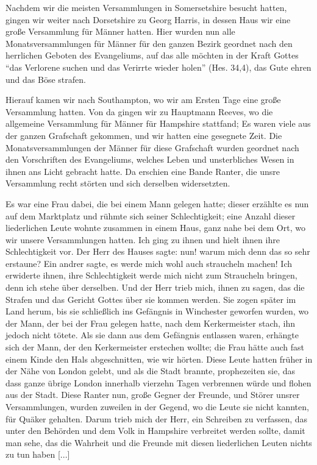 Nachdem wir die meisten Versammlungen in Somersetshire
besucht hatten, gingen wir weiter nach Dorsetshire 
zu Georg Harris,
in dessen Haus wir eine große Versammlung für Männer hatten.
Hier wurden nun alle Monatsversammlungen für Männer für
den ganzen Bezirk geordnet nach den herrlichen Geboten des
Evangeliums, auf das alle möchten in der Kraft Gottes "`das
Verlorene suchen und das Verirrte wieder holen"' (Hes. 34,4),
das Gute ehren und das Böse strafen.

Hierauf kamen wir nach Southampton, wo wir am Ersten
Tage eine große Versammlung hatten. Von da gingen wir zu
Hauptmann Reeves, 
wo die allgemeine Versammlung für Männer
für Hampshire stattfand; Es waren viele aus der ganzen Grafschaft 
gekommen, und wir hatten eine gesegnete Zeit. Die Monatsversammlungen 
der Männer für diese Grafschaft wurden geordnet
nach den Vorschriften des Evangeliums, welches Leben und
unsterbliches Wesen in ihnen ans Licht gebracht hatte. Da erschien
eine Bande Ranter, die unsre Versammlung recht störten und
sich derselben widersetzten.

Es war eine Frau dabei, die bei einem Mann gelegen hatte;
dieser erzählte es nun auf dem Marktplatz und rühmte sich
seiner Schlechtigkeit; eine Anzahl dieser liederlichen Leute wohnte
zusammen in einem Haus, ganz nahe bei dem Ort, wo wir unsere
Versammlungen hatten. Ich ging zu ihnen und hielt ihnen ihre
Schlechtigkeit vor. Der Herr des Hauses sagte: nun! warum mich
denn das so sehr erstaune? Ein andrer sagte, es werde mich
wohl auch straucheln machen! Ich erwiderte ihnen, ihre
Schlechtigkeit werde mich nicht zum Straucheln bringen, denn ich stehe
über derselben. Und der Herr trieb mich, ihnen zu sagen, das
die Strafen und das Gericht Gottes über sie kommen werden.
Sie zogen später im Land herum, bis sie schließlich ins Gefängnis
in Winchester geworfen wurden, wo der Mann, der bei der Frau
gelegen hatte, nach dem Kerkermeister stach, ihn jedoch nicht tötete.
Als sie dann aus dem Gefängnis entlassen waren, erhängte sich
der Mann, der den Kerkermeister erstechen wollte; die Frau hätte
auch fast einem Kinde den Hals abgeschnitten, wie wir hörten.
Diese Leute hatten früher in der Nähe von London gelebt, und als
die Stadt brannte, prophezeiten sie, das dass ganze übrige London
innerhalb vierzehn Tagen verbrennen würde und flohen aus der
Stadt. Diese Ranter nun, große Gegner der Freunde, und Störer
unsrer Versammlungen, wurden zuweilen in der Gegend, wo die
Leute sie nicht kannten, für Quäker gehalten. Darum trieb mich
der Herr, ein Schreiben zu verfassen, das unter den Behörden
und dem Volk in Hampshire verbreitet werden sollte, damit man
sehe, das die Wahrheit und die Freunde mit diesen liederlichen
Leuten nichts zu tun haben [...]


